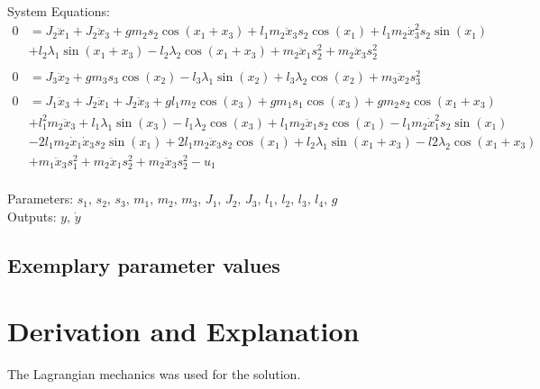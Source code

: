\documentclass[10pt,a4paper]{article}
\begin{document}
	\noindent System Equations:
	\begin{subequations}
	\begin{align*}
	0 &= J_2\ddot{x}_1 + J_2\ddot{x}_3 + g m_2 s_2\cos(x_1 + x_3) + l_1 m_2 \ddot{x}_3 s_2 \cos(x_1) + l_1 m_2 \dot{x}_3^2 s_2 \sin(x_1) \\
	&+ l_2 \lambda_1 \sin(x_1 + x_3) - l_2 \lambda_2 \cos(x_1 + x_3) + m_2 \ddot{x}_1 s_2^2 + m_2 \ddot{x}_3 s_2^2 \\
	\\
	0 &= J_3 \ddot{x}_2 + g m_3 s_3 \cos(x_2) - l_3 \lambda_1 \sin(x_2) + l_3 \lambda_2 \cos(x_2) + m_3 \ddot{x}_2 s_3^2 \\
	\\
	0 &= J_1 \ddot{x}_3 + J_2 \ddot{x}_1 + J_2 \ddot{x}_3 + g l_1 m_2 \cos(x_3) + g m_1 s_1 \cos(x_3) + g m_2 s_2 \cos(x_1 + x_3) \\
	&+ l_1^2 m_2 \ddot{x}_3 + l_1 \lambda_1 \sin(x_3) - l_1 \lambda_2 \cos(x_3) + l_1 m_2 \ddot{x}_1 s_2 \cos(x_1)- l_1 m_2 \dot{x}_1^2 s_2 \sin(x_1) \\
	&- 2 l_1 m_2 \dot{x}_1 \dot{x}_3 s_2 \sin(x_1) + 2 l_1 m_2 \ddot{x}_3 s_2 \cos(x_1)+ l_2 \lambda_1 \sin(x_1 + x_3) - l2 \lambda_2 \cos(x_1 + x_3) \\
	&+ m_1 \ddot{x}_3 s_1^2 + m_2 \ddot{x}_1 s_2^2 + m_2 \ddot{x}_3 s_2^2 - u_1 \\
	\end{align*}
	\end{subequations}

	\noindent
	Parameters: $s_1, \, s_2, \, s_3, \, m_1, \, m_2, \, m_3, \, J_1, \, J_2, \, J_3, \, l_1, \, l_2, \, l_3, \, l_4, \, g$%
	\\
	Outputs: $y, \, \dot{y}$ %




	\subsection{Exemplary parameter values}
	


	\section{Derivation and Explanation} %
	The Lagrangian mechanics was used for the solution.
\end{document}
